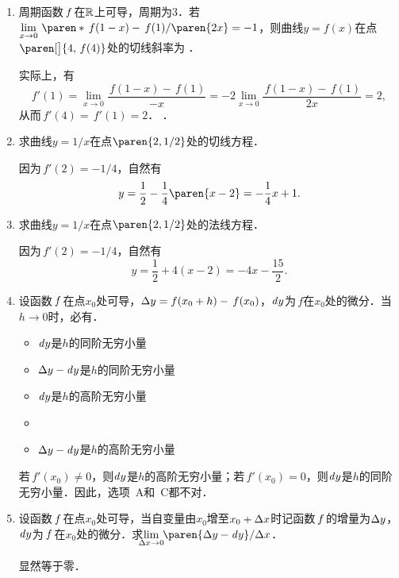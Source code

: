 \begin{enumerate}
\item 周期函数\(\,f\mkern2mu\)在\(\mathbb{R}\)上可导，周期为\(3\)．若\(\lim\limits_{x\to0} \,\paren*{\,f(1-x)-\,f(1)}/\paren{2x} = -1\)，则曲线\(y = f(x)\)在点\(\paren[\big]{4, \,f(4)}\)处的切线斜率为
  \ifshowsol
    \uline{}．

    实际上，有
    \begin{equation*}
      f'(1)
      = \lim_{x\to0} \frac{\,f(1-x) - \,f(1)}{-x}
      = -2 \lim_{x\to0} \frac{\,f(1-x)-\,f(1)}{2x}
      = 2,
    \end{equation*}
    从而\(\,f'(4) = \,f'(1) = 2\)．
  \else
    \uline{\hspace{4em}}．
  \fi

\item 求曲线\(y = 1/x\)在点\(\paren{2,1/2}\)处的切线方程．

  \ifshowsol
    因为\(\,f'(2) = -1/4\)，自然有
    \begin{equation*}
      y = \frac12 - \frac14 \paren{x-2} = -\frac14 x + 1.
    \end{equation*}
  \fi

\item 求曲线\(y = 1/x\)在点\(\paren{2,1/2}\)处的法线方程．

  \ifshowsol
    因为\(\,f'(2) = -1/4\)，自然有
    \begin{equation*}
      y = \frac12 + 4(x-2) = -4x - \frac{15}{2}.
    \end{equation*}
  \fi

\item 设函数\(\,f\mkern2mu\)在点\(x_0\)处可导，\(\mathop{}\!\Delta y = f(x_0+h) - \,f(x_0)\)，\(\mathop{}\!\mathit{d} y\)为\(\,f\)在\(x_0\)处的微分．当\(h \to 0\)时，必有\uline{\hspace*{6em}}．
  \begin{itemize}
    \renewcommand{\labelitemi}{\faCircleThin}
  \item \(\mathop{}\!\mathit{d} y\)是\(h\)的同阶无穷小量
  \item \(\mathop{}\!\Delta y - \mathop{}\!\mathit{d} y\)是\(h\)的同阶无穷小量
  \item \(\mathop{}\!\mathit{d} y\)是\(h\)的高阶无穷小量
    \ifshowsol
    \item[\faCircle]
    \else
    \item
    \fi
    \(\mathop{}\!\Delta y - \mathop{}\!\mathit{d} y\)是\(h\)的高阶无穷小量
  \end{itemize}

  \ifshowsol
    若\(\,f'(x_0) \ne 0\)，则\(\mathop{}\!\mathit{d} y\)是\(h\)的高阶无穷小量；若\(\,f'(x_0) = 0\)，则\(\mathop{}\!\mathit{d} y\)是\(h\)的同阶无穷小量．因此，选项~A和~C都不对．
  \fi

\item 设函数\(\,f\mkern2mu\)在点\(x_0\)处可导，当自变量由\(x_0\)增至\(x_0+\mathop{}\!\Delta x\)时记函数\(\,f\mkern2mu\)的增量为\(\mathop{}\!\Delta y\)，\(\mathop{}\!\mathit{d} y\)为\(\,f\mkern2mu\)在\(x_0\)处的微分．求\(\lim\limits_{\mathclap{\fdx\to0}} \,\paren{\fdy - \dy}/{\fdx}\)．

  \ifshowsol
    显然等于零．
  \fi
\end{enumerate}
\fi


